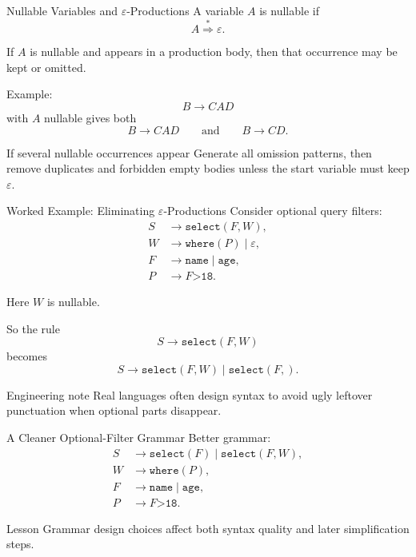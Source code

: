 \documentclass[aspectratio=169,10pt]{beamer}
\newcommand{\eps}{\varepsilon}
\newcommand{\ders}{\overset{*}{\Rightarrow}}
\newcommand{\code}[1]{\texttt{#1}}
\begin{document}
\begin{frame}{Nullable Variables and \(\eps\)-Productions}
\small
A variable \(A\) is \alert{nullable} if
\[
A\ders\eps.
\]

If \(A\) is nullable and appears in a production body, then that occurrence may be kept or omitted.

\vspace{0.5em}
Example:
\[
B\to C A D
\]
with \(A\) nullable gives both
\[
B\to C A D
\qquad\text{and}\qquad
B\to C D.
\]

\begin{alertblock}{If several nullable occurrences appear}
Generate all omission patterns, then remove duplicates and forbidden empty bodies unless the start variable must keep \(\eps\).
\end{alertblock}
\end{frame}

\begin{frame}{Worked Example: Eliminating \(\eps\)-Productions}
\small
Consider optional query filters:
\[
\begin{aligned}
S&\to \code{select}(F,W),\\
W&\to \code{where}(P)\mid\eps,\\
F&\to \code{name}\mid\code{age},\\
P&\to F\code{>}\code{18}.
\end{aligned}
\]

Here \(W\) is nullable.

So the rule
\[
S\to \code{select}(F,W)
\]
becomes
\[
S\to \code{select}(F,W)
\mid
\code{select}(F,).
\]

\begin{alertblock}{Engineering note}
Real languages often design syntax to avoid ugly leftover punctuation when optional parts disappear.
\end{alertblock}
\end{frame}

\begin{frame}{A Cleaner Optional-Filter Grammar}
\small
Better grammar:
\[
\begin{aligned}
S&\to \code{select}(F)\mid \code{select}(F,W),\\
W&\to \code{where}(P),\\
F&\to \code{name}\mid\code{age},\\
P&\to F\code{>}\code{18}.
\end{aligned}
\]

\begin{exampleblock}{Lesson}
Grammar design choices affect both syntax quality and later simplification steps.
\end{exampleblock}
\end{frame}
\end{document}
